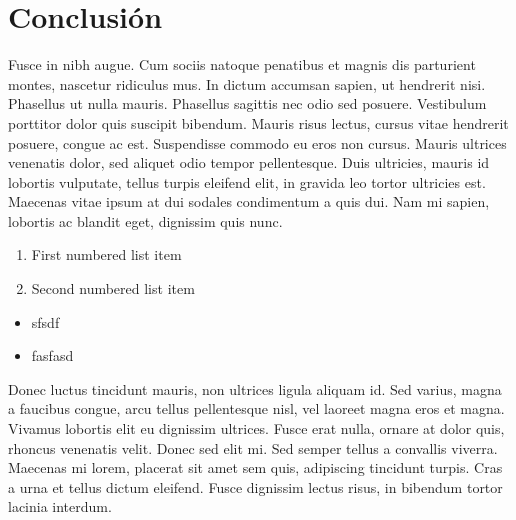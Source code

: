 \documentclass[10pt]{article}
\begin{document}
\section{Conclusión}

Fusce in nibh augue. Cum sociis natoque penatibus et magnis dis parturient montes, nascetur ridiculus mus. In dictum accumsan sapien, ut hendrerit nisi. Phasellus ut nulla mauris. Phasellus sagittis nec odio sed posuere. Vestibulum porttitor dolor quis suscipit bibendum. Mauris risus lectus, cursus vitae hendrerit posuere, congue ac est. Suspendisse commodo eu eros non cursus. Mauris ultrices venenatis dolor, sed aliquet odio tempor pellentesque. Duis ultricies, mauris id lobortis vulputate, tellus turpis eleifend elit, in gravida leo tortor ultricies est. Maecenas vitae ipsum at dui sodales condimentum a quis dui. Nam mi sapien, lobortis ac blandit eget, dignissim quis nunc.

\begin{enumerate}
   \item First numbered list item
   \item Second numbered list item
\end{enumerate}

\begin{itemize}
   \item sfsdf
   \item fasfasd
\end{itemize}

Donec luctus tincidunt mauris, non ultrices ligula aliquam id. Sed varius, magna a faucibus congue, arcu tellus pellentesque nisl, vel laoreet magna eros et magna. Vivamus lobortis elit eu dignissim ultrices. Fusce erat nulla, ornare at dolor quis, rhoncus venenatis velit. Donec sed elit mi. Sed semper tellus a convallis viverra. Maecenas mi lorem, placerat sit amet sem quis, adipiscing tincidunt turpis. Cras a urna et tellus dictum eleifend. Fusce dignissim lectus risus, in bibendum tortor lacinia interdum.




\end{document}
